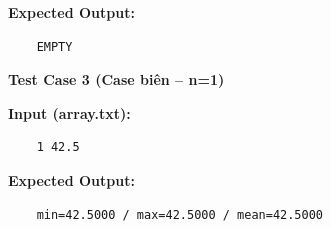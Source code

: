     \textbf{Expected Output:}
    \begin{lstlisting}
    EMPTY\end{lstlisting}
    \textbf{Test Case 3 (Case biên -- n=1)}

    \textbf{Input (array.txt):}
    \begin{lstlisting}
    1 42.5\end{lstlisting}

    \textbf{Expected Output:}
    \begin{lstlisting}
    min=42.5000 / max=42.5000 / mean=42.5000\end{lstlisting}